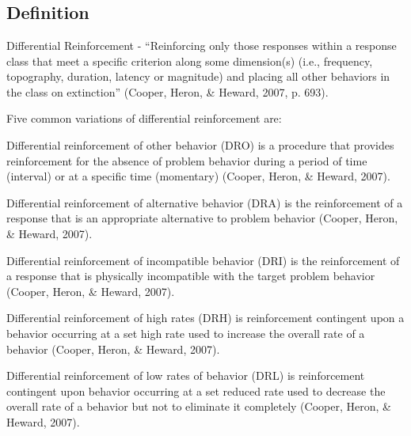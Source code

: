 \clearpage \section[\fourdTwentyOne{}]{\fourdTwentyOne{}%
              }
\subsection{Definition} 
Differential Reinforcement - ``Reinforcing only those responses within a response class that meet a specific criterion along some dimension(s) (i.e., frequency, topography, duration, latency or magnitude) and placing all other behaviors in the class on extinction'' (Cooper, Heron, \& Heward, 2007, p. 693).

Five common variations of differential reinforcement are: 

Differential reinforcement of other behavior (DRO) is a procedure that provides reinforcement for the absence of problem behavior during a period of time (interval) or at a specific time (momentary) (Cooper, Heron, \& Heward, 2007).

Differential reinforcement of alternative behavior (DRA) is the reinforcement of a response that is an appropriate alternative to problem behavior (Cooper, Heron, \& Heward, 2007).

Differential reinforcement of incompatible behavior (DRI) is the reinforcement of a response that is physically incompatible with the target problem behavior (Cooper, Heron, \& Heward, 2007). 

Differential reinforcement of high rates (DRH) is reinforcement contingent upon a behavior occurring at a set high rate used to increase the overall rate of a behavior (Cooper, Heron, \& Heward, 2007).

Differential reinforcement of low rates of behavior (DRL) is reinforcement contingent upon behavior occurring at a set reduced rate used to decrease the overall rate of a behavior but not to eliminate it completely (Cooper, Heron, \& Heward, 2007).
%

